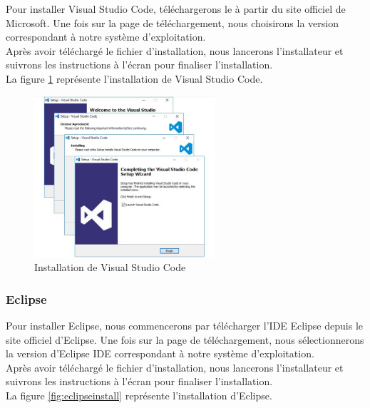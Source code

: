 \documentclass[12pt]{report}
\begin{document}
			\hspace{15pt} Pour installer Visual Studio Code, téléchargerons le à partir du site officiel de Microsoft. Une fois sur la page de téléchargement, nous choisirons la version correspondant à notre système d'exploitation.\\
			 Après avoir téléchargé le fichier d'installation, nous lancerons l'installateur et suivrons les instructions à l'écran pour finaliser l'installation.\\
			
			La figure \ref{fig:vscode} représente l’installation de Visual Studio Code.
			
			\begin{figure}[h]
				\centering
				\includegraphics[width=0.6\textwidth]{vscode.png}
				\caption{Installation de Visual Studio Code}
				\label{fig:vscode}
			\end{figure}
			\FloatBarrier

			\subsubsection{Eclipse}

			\hspace{15pt} Pour installer Eclipse, nous commencerons par télécharger l'IDE Eclipse depuis le site officiel d'Eclipse. Une fois sur la page de téléchargement, nous sélectionnerons la version d'Eclipse IDE correspondant à notre système d'exploitation.\\

			Après avoir téléchargé le fichier d'installation, nous lancerons l'installateur et suivrons les instructions à l'écran pour finaliser l'installation.\\

			La figure \ref{fig:eclipseinstall} représente l’installation d'Eclipse.
			
\end{document}
